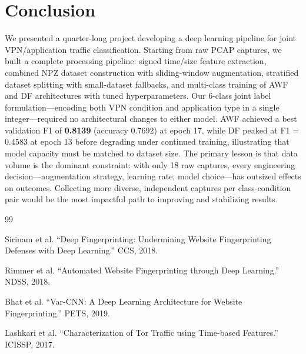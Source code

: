 \documentclass[letterpaper,twocolumn,10pt]{article}
\begin{document}
\section{Conclusion}

We presented a quarter-long project developing a deep learning pipeline for joint VPN/application traffic classification. Starting from raw PCAP captures, we built a complete processing pipeline: signed time/size feature extraction, combined NPZ dataset construction with sliding-window augmentation, stratified dataset splitting with small-dataset fallbacks, and multi-class training of AWF and DF architectures with tuned hyperparameters. Our 6-class joint label formulation---encoding both VPN condition and application type in a single integer---required no architectural changes to either model. AWF achieved a best validation F1 of \textbf{0.8139} (accuracy 0.7692) at epoch 17, while DF peaked at F1 = 0.4583 at epoch 13 before degrading under continued training, illustrating that model capacity must be matched to dataset size. The primary lesson is that data volume is the dominant constraint: with only 18 raw captures, every engineering decision---augmentation strategy, learning rate, model choice---has outsized effects on outcomes. Collecting more diverse, independent captures per class-condition pair would be the most impactful path to improving and stabilizing results.

\begin{thebibliography}{99}

Sirinam et al.
\newblock ``Deep Fingerprinting: Undermining Website Fingerprinting Defenses with Deep Learning.''
\newblock CCS, 2018.

Rimmer et al.
\newblock ``Automated Website Fingerprinting through Deep Learning.''
\newblock NDSS, 2018.

Bhat et al.
\newblock ``Var-CNN: A Deep Learning Architecture for Website Fingerprinting.''
\newblock PETS, 2019.

Lashkari et al.
\newblock ``Characterization of Tor Traffic using Time-based Features.''
\newblock ICISSP, 2017.

\end{thebibliography}
\end{document}
